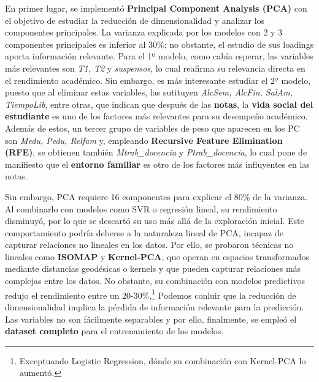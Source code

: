\documentclass{article}
\begin{document}
En primer lugar, se implementó \textbf{Principal Component Analysis (PCA)} con el objetivo de estudiar la reducción de dimensionalidad y analizar los componentes principales. 
La varianza explicada por los modelos con 2 y 3 componentes principales es inferior al 30\%; no obstante, el estudio de sus loadings aporta información relevante. 
Para el 1º modelo, como cabía esperar, las variables más relevantes son \textit{T1, T2} y \textit{suspensos}, lo cual reafirma su relevancia directa en el rendimiento académico. Sin embargo, es más interesante estudiar el 2º modelo, puesto que al eliminar estas variables, las sutituyen \textit{AlcSem, AlcFin, SalAm, TiempoLib}, entre otras, que
 indican que después de las \textbf{notas}, la \textbf{vida social del estudiante} es uno de los factores más relevantes para su desempeño académico. 
 Además de estos, un tercer grupo de variables de peso que aparecen en los PC son \textit{Medu, Pedu, Relfam} y, empleando \textbf{Recursive Feature Elimination (RFE)}, 
se obtienen también \textit{Mtrab\_docencia} y \textit{Ptrab\_docencia}, lo cual pone de manifiesto que el \textbf{entorno familiar} es otro de los factores más influyentes en las notas. 

Sin embargo, PCA requiere 16 componentes para explicar el 80\% de la varianza. Al combinarlo con modelos como SVR o regresión lineal, su rendimiento disminuyó, por lo que se descartó su uso 
más allá de la exploración inicial. Este comportamiento podría deberse a la naturaleza lineal de PCA, incapaz de capturar relaciones no lineales en los datos. Por ello, se probaron 
técnicas no lineales como \textbf{ISOMAP} y \textbf{Kernel-PCA}, que operan en espacios transformados mediante distancias geodésicas o kernels y que pueden capturar relaciones más complejas entre los datos. No obstante, su combinación con modelos predictivos redujo el rendimiento entre un 20-30\%,\footnote{Exceptuando 
 Logistic Regression, dónde su combinación con Kernel-PCA lo aumentó.} 
Podemos conluir que la reducción de dimensionalidad implica la pérdida de información relevante para la predicción. Las variables no son fácilmente separables y por ello, finalmente, se empleó el \textbf{dataset completo} para el entrenamiento de los modelos.
\end{document}
